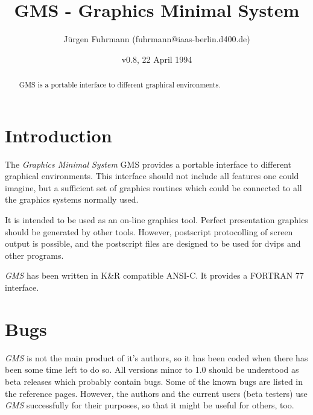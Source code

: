 %
%
%
%
%
\title{ GMS - Graphics Minimal System }
\author{J\"{u}rgen Fuhrmann  (fuhrmann@iaas-berlin.d400.de)}
\date{v0.8, 22 April 1994
}
\sloppy



\maketitle
\begin{abstract}
GMS is a portable interface to different graphical
environments.
\end{abstract}
\tableofcontents

\section{Introduction\label{intro}}The {\em Graphics Minimal System\/} GMS 
provides  a portable interface to different graphical
environments.
This interface should not include all features one
could imagine, but a sufficient set of graphics
routines which could be connected to all the graphics
systems normally used.



It is intended to be used as an on-line graphics tool.
Perfect presentation graphics should be generated by
other tools.
However, postscript protocolling of screen output is 
possible,  and the postscript files are designed to
be used for dvips and  other programs.



{\em GMS\/} has been written in K\&R compatible ANSI-C.
It provides a FORTRAN 77 interface.




\section{Bugs\label{Bugs}}{\em GMS\/} is not the main product of it's authors, so it
has been coded when there has been some time left to do so.
All versions minor to 1.0 should be understood as 
beta releases which probably contain bugs. Some of
the known bugs are listed in the reference pages.
However, the authors and
the current users (beta testers) use {\em GMS\/} successfully
for their purposes, so that it might be useful for others, too.

